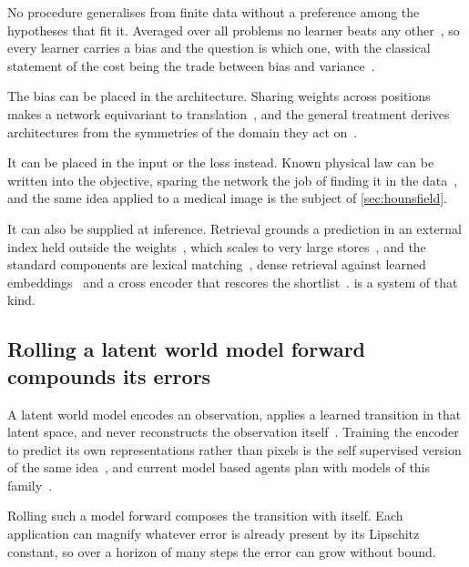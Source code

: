 No procedure generalises from finite data without a preference among the
hypotheses that fit it. Averaged over all problems no learner beats any
other~\cite{wolpert_free_1997}, so every learner carries a bias and the
question is which one, with the classical statement of the cost being the
trade between bias and variance~\cite{etal_neural_1992, mitchell_need_1980}.

The bias can be placed in the architecture. Sharing weights across positions
makes a network equivariant to translation~\cite{etal_gradient_1998}, and the
general treatment derives architectures from the symmetries of the domain they
act on~\cite{bronstein_geometric_2021}.

It can be placed in the input or the loss instead. Known physical law can be
written into the objective, sparing the network the job of finding it in the
data~\cite{raissi_physics_2019}, and the same idea applied to a medical image
is the subject of \cref{sec:hounsfield}.

It can also be supplied at inference. Retrieval grounds a prediction in an
external index held outside the weights~\cite{lewis_retrieval_2021}, which
scales to very large stores~\cite{borgeaud_improving_2022}, and the standard
components are lexical matching~\cite{robertson_probabilistic_2009}, dense
retrieval against learned embeddings~\cite{karpukhin_dense_2020} and a cross
encoder that rescores the shortlist~\cite{nogueira_passage_2019}.
 is a system of that kind.

\subsection{Rolling a latent world model forward compounds its errors}
\label{sec:bg_worldmodels}

A latent world model encodes an observation, applies a learned transition in
that latent space, and never reconstructs the observation
itself~\cite{lecun_path_2022}. Training the encoder to predict its own
representations rather than pixels is the self supervised version of the same
idea~\cite{assran_self_2023}, and current model based agents plan with models
of this family~\cite{hafner_mastering_2023, schwarzer_data_2021}.

Rolling such a model forward composes the transition with itself. Each
application can magnify whatever error is already present by its Lipschitz
constant, so over a horizon of many steps the error can grow without bound.

